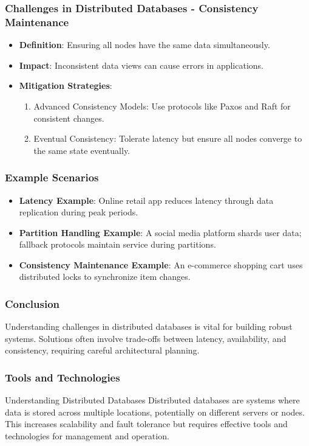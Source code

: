 \documentclass[aspectratio=169]{beamer}
\begin{document}
\begin{frame}[fragile]
    \frametitle{Challenges in Distributed Databases - Consistency Maintenance}
    
    \begin{itemize}
        \item \textbf{Definition}: Ensuring all nodes have the same data simultaneously.
        \item \textbf{Impact}: Inconsistent data views can cause errors in applications.
        \item \textbf{Mitigation Strategies}:
        \begin{enumerate}
            \item Advanced Consistency Models: Use protocols like Paxos and Raft for consistent changes.
            \item Eventual Consistency: Tolerate latency but ensure all nodes converge to the same state eventually.
        \end{enumerate}
    \end{itemize}
\end{frame}

\begin{frame}[fragile]
    \frametitle{Example Scenarios}
    
    \begin{itemize}
        \item \textbf{Latency Example}: Online retail app reduces latency through data replication during peak periods.
        \item \textbf{Partition Handling Example}: A social media platform shards user data; fallback protocols maintain service during partitions.
        \item \textbf{Consistency Maintenance Example}: An e-commerce shopping cart uses distributed locks to synchronize item changes.
    \end{itemize}
\end{frame}

\begin{frame}[fragile]
    \frametitle{Conclusion}
    
    Understanding challenges in distributed databases is vital for building robust systems. Solutions often involve trade-offs between latency, availability, and consistency, requiring careful architectural planning.
\end{frame}

\begin{frame}[fragile]
    \frametitle{Tools and Technologies}
    \begin{block}{Understanding Distributed Databases}
        Distributed databases are systems where data is stored across multiple locations, potentially on different servers or nodes. This increases scalability and fault tolerance but requires effective tools and technologies for management and operation.
    \end{block}
\end{frame}
\end{document}
